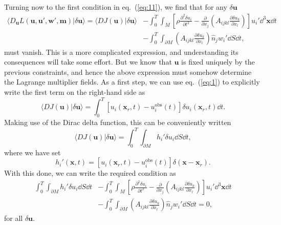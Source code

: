 Turning now to the first condition in eq.~(\ref{eq:11}), we find that for any $\delta \mathbf{u}$
\begin{align}
\langle D_{\mathbf{u}}L(\mathbf{u},\mathbf{u}',\mathbf{w}',\mathbf{m})|\delta \mathbf{u}\rangle = \langle DJ(\mathbf{u})|\delta \mathbf{u}\rangle &- \int_{0}^{T}\int_{M}\left[\rho\frac{\partial^{2}\delta u_{i}}{\partial t^{2}}-\frac{\partial}{\partial x_{j}}
\left(A_{ijkl}\frac{\partial\delta u_{k}}{\partial x_{l}}\right)\right]u_{i}'\dd^{3}\mathbf{x}\dd t \nonumber \\
&- \int_{0}^{T}\int_{\partial M}\left(A_{ijkl}\frac{\partial\delta u_{k}}{\partial x_{l}}\right)\hat{n}_{j}w_{i}'\dd S\dd t,
\label{eq:16}
\end{align}
must vanish. This is a more complicated expression, and understanding its consequences will take some effort. 
But we know that $\mathbf{u}$ is fixed uniquely by the previous constraints, and hence the above expression 
must somehow determine the Lagrange multiplier fields. As a first step, we can use eq.~(\ref{eq:1}) to explicitly write 
the first term on the right-hand side as
\begin{equation}
\langle DJ(\mathbf{u})|\delta \mathbf{u}\rangle=\int_{0}^{T}[u_{i}(\mathbf{x}_{r},t)-u_{i}^{\mathrm{obs}}(t)]\delta u_{i}(\mathbf{x}_{r},t)\dd t.
\label{eq:17}
\end{equation}
Making use of the Dirac delta function, this can be conveniently written
\begin{equation}
\langle DJ(\mathbf{u})|\delta \mathbf{u}\rangle=\int_{0}^{T}\int_{\partial M}h_{i}'\delta u_{i}\dd S\dd t,
\label{eq:18}
\end{equation}
where we have set
\begin{equation}
h_{i}'(\mathbf{x},t)=[u_{i}(\mathbf{x}_{r},t)-u_{i}^{\mathrm{obs}}(t)]\delta(\mathbf{x}-\mathbf{x}_{r}).
\label{eq:19}
\end{equation}
With this done, we can write the required condition as
\begin{align}
\int_{0}^{T}\int_{\partial M}h_{i}'\delta u_{i}\dd S\dd t &- \int_{0}^{T}\int_{M}\left[\rho\frac{\partial^{2}\delta u_{i}}{\partial t^{2}}-\frac{\partial}{\partial x_{j}}
\left(A_{ijkl}\frac{\partial\delta u_{k}}{\partial x_{l}}\right)\right]u_{i}'\dd^{3}\mathbf{x}\dd t \nonumber \\
&- \int_{0}^{T}\int_{\partial M}\left(A_{ijkl}\frac{\partial\delta u_{k}}{\partial x_{l}}\right)\hat{n}_{j}w_{i}'\dd S\dd t=0,
\label{eq:20}
\end{align}
for all $\delta \mathbf{u}$. 

